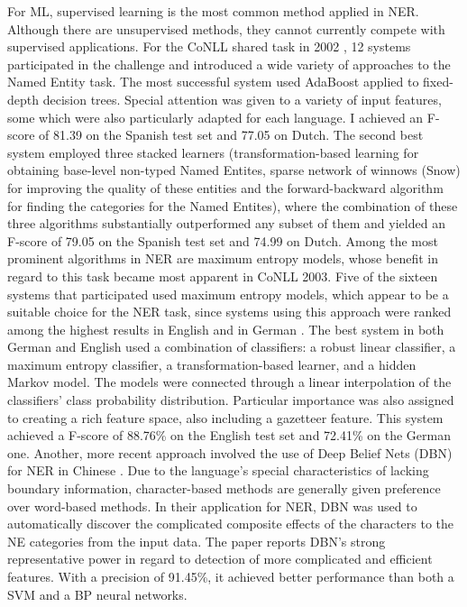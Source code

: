 \documentclass[11pt]{article}
\begin{document}
For ML, supervised learning is the most common method applied in NER.
Although there are unsupervised methods, they cannot currently compete with supervised applications.
For the CoNLL shared task in 2002 \cite{tksintro}, 12 systems participated in the challenge and introduced a wide variety of approaches to the Named Entity task.
The most successful system used AdaBoost applied to fixed-depth decision trees. Special attention was given to a variety of input features, some which were also
particularly adapted for each language. I achieved an F-score of 81.39 on the Spanish test set and 77.05 on Dutch.
The second best system \cite{Florian:2002:NER:1118853.1118863} employed three stacked
learners (transformation-based learning for obtaining base-level non-typed Named Entites, sparse network of winnows (Snow) for improving the quality of these entities 
and the forward-backward algorithm for finding the categories for the Named Entites), where the combination of these three algorithms substantially outperformed 
any subset of them and yielded an F-score of 79.05 on the Spanish test set and 74.99 on Dutch.
Among the most prominent algorithms in NER are maximum entropy models, whose benefit in regard to this task became most apparent in CoNLL 2003. 
Five of the sixteen systems that participated used maximum entropy models, which appear to be a suitable choice for the NER task, 
since systems using this approach were ranked among the highest results in English and in German \cite{TjongKimSang:2003:ICS:1119176.1119195}.
The best system in both German and English \cite{Florian:2003:NER:1119176.1119201} used a combination of classifiers: a robust linear classifier, 
a maximum entropy classifier, a transformation-based learner, and a hidden Markov model. The models were connected through a linear interpolation 
of the classifiers’ %
class probability distribution. Particular importance was also assigned to creating a rich feature space, also including a gazetteer feature. 
This system achieved a F-score of 88.76\% on the English test set and 72.41\% on the German one.
Another, more recent approach involved the use of Deep Belief Nets (DBN) for NER in Chinese \cite{Chen:2010:UDB:1870457.1870473}.
Due to the language's special characteristics of lacking boundary information, character-based methods are generally given preference over word-based methods.
In their application for NER, DBN  was used to automatically discover the complicated composite effects of the characters to the NE categories from the input data. 
The paper reports DBN's strong representative power in regard to detection of more complicated and efficient features. With a precision of 91.45\%,
it achieved better performance than both a SVM and a BP neural networks.
\end{document}
